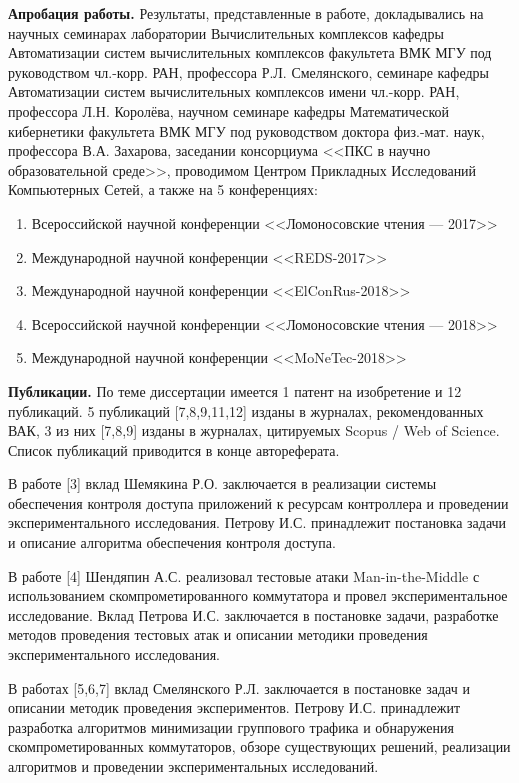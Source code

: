 \documentclass[14pt,autoref,href]{disser}
\theoremstyle{definition}
\begin{document}
\textbf{Апробация работы.} Результаты, представленные в работе, докладывались на научных семинарах лаборатории Вычислительных комплексов кафедры Автоматизации систем вычислительных комплексов факультета ВМК МГУ под руководством чл.-корр. РАН, профессора Р.Л. Смелянского, семинаре кафедры Автоматизации систем вычислительных комплексов имени чл.-корр. РАН, профессора Л.Н. Королёва, научном семинаре кафедры Математической кибернетики факультета ВМК МГУ под руководством доктора физ.-мат. наук, профессора В.А. Захарова, заседании консорциума <<ПКС в научно образовательной среде>>, проводимом Центром Прикладных Исследований Компьютерных Сетей, а также на 5 конференциях:
\begin{enumerate}
\setlength\itemsep{0.05cm}
\item Всероссийской научной конференции <<Ломоносовские чтения --- 2017>>
\item Международной научной конференции <<REDS-2017>>
\item Международной научной конференции <<ElConRus-2018>>
\item Всероссийской научной конференции <<Ломоносовские чтения --- 2018>>
\item Международной научной конференции <<MoNeTec-2018>>
\end{enumerate}

\textbf{Публикации.} По теме диссертации имеется 1 патент на изобретение и 12 публикаций.
5 публикаций [7,8,9,11,12] изданы в журналах, рекомендованных ВАК, 3 из них [7,8,9] изданы в журналах, цитируемых Scopus / Web of Science.
Список публикаций приводится в конце автореферата.

В работе [3] вклад Шемякина Р.О. заключается в реализации системы обеспечения контроля доступа приложений к ресурсам контроллера и проведении экспериментального исследования.
Петрову И.С. принадлежит постановка задачи и описание алгоритма обеспечения контроля доступа.

В работе [4] Шендяпин А.С. реализовал тестовые атаки Man-in-the-Middle с использованием скомпрометированного коммутатора и провел экспериментальное исследование.
Вклад Петрова И.С. заключается в постановке задачи, разработке методов проведения тестовых атак и описании методики проведения экспериментального исследования.

В работах [5,6,7] вклад Смелянского Р.Л. заключается в постановке задач и описании методик проведения экспериментов.
Петрову И.С. принадлежит разработка алгоритмов минимизации группового трафика и обнаружения скомпрометированных коммутаторов, обзоре существующих решений, реализации алгоритмов и проведении экспериментальных исследований.
\end{document}
